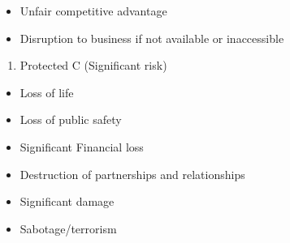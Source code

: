 \documentclass[]{book}
\providecommand{\tightlist}{%
  \setlength{\itemsep}{0pt}\setlength{\parskip}{0pt}}
\begin{document}
\begin{itemize}
\tightlist
\item
  Unfair competitive advantage
\item
  Disruption to business if not available or inaccessible
\end{itemize}

\begin{enumerate}
\def\labelenumi{\arabic{enumi}.}
\setcounter{enumi}{3}
\tightlist
\item
  Protected C (Significant risk)
\end{enumerate}

\begin{itemize}
\tightlist
\item
  Loss of life
\item
  Loss of public safety
\item
  Significant Financial loss
\item
  Destruction of partnerships and relationships
\item
  Significant damage
\item
  Sabotage/terrorism
\end{itemize}
\end{document}

